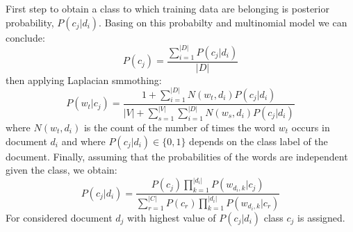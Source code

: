 First step to obtain a class to which training data are belonging is posterior probability, $P(c_j |d_i )$. Basing on this probabilty and multinomial model \cite{5}we can conclude:
\begin{equation}
P(c_j) = \frac{\sum_{i=1}^{|D|}P(c_j |d_i )}{|D|}
\end{equation}
\newline then applying Laplacian smmothing:
\begin{equation}
P(w_t|c_j)=\frac{1+\sum_{i=1}^{|D|}N(w_t,d_i)P(c_j|d_i)}{|V|+\sum_{s=1}^{|V|} \sum_{i=1}^{|D|}N(w_s,d_i)P(c_j|d_i)}
\end{equation}
\newline 
where $N(w_t,d_i)$ is the count of the number of times the word $w_t$ occurs in document
$d_i$ and where $P(c_j|d_i) \in \{0,1\} $ depends on the class label of the document.
Finally, assuming that the probabilities of the words are independent given the
class, we obtain:
\begin{equation}
P(c_j|d_i)=\frac{P(c_j)\prod_{k=1}^{|d_i|}P(w_{d_i,k}| c_j)}{\sum_{r=1}^{|C|}P(c_r)\prod_{k=1}^{|d_i|}P(w_{d_i,k}|c_r)}
\end{equation}
\newline For considered document $d_j$ with highest value of $P(c_j|d_i)$ class $c_j$ is assigned.

